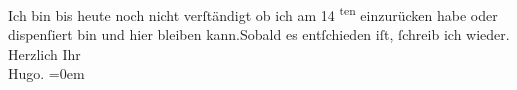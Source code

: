 \begin{ledgroupsized}[t]{13cm}
           \pstart
           Ich bin bis heute noch nicht verſtändigt ob ich am {\pb}14\textsuperscript{
                        ten} einzurücken habe oder dispenſiert bin und hier bleiben kann.\hspace*{1.5em}Sobald es entſchieden iſt, ſchreib ich
                    wieder.\pend
           \pstart
           Herzlich Ihr{\\[\baselineskip]}\spacefill\mbox{Hugo.}\pend
           \leftskip=0em{}\endnumbering{}\end{ledgroupsized}  \newcommand{\dateiname}{L01423}\newcommand{\titel}{Hugo von Hofmannsthal an Arthur Schnitzler, 8. 8. 1904}\newcommand{\editorInnen}{ Martin Anton Müller und Gerd-Hermann Susen}
      